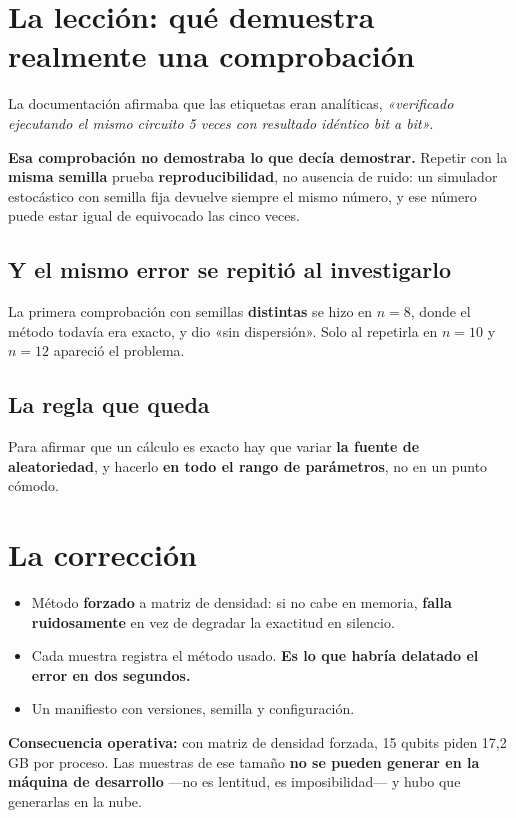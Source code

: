 \section{La lección: qué demuestra realmente una comprobación}
\label{sec:leccion}
La documentación afirmaba que las etiquetas eran analíticas, \textit{«verificado ejecutando el
mismo circuito 5 veces con resultado idéntico bit a bit»}.

\textbf{Esa comprobación no demostraba lo que decía demostrar.} Repetir con la \textbf{misma
semilla} prueba \textbf{reproducibilidad}, no ausencia de ruido: un simulador estocástico con
semilla fija devuelve siempre el mismo número, y ese número puede estar igual de equivocado
las cinco veces.

\subsection{Y el mismo error se repitió al investigarlo}
La primera comprobación con semillas \textbf{distintas} se hizo en $n = 8$, donde el método
todavía era exacto, y dio «sin dispersión». Solo al repetirla en $n = 10$ y $n = 12$ apareció
el problema.

\subsection{La regla que queda}
Para afirmar que un cálculo es exacto hay que variar \textbf{la fuente de aleatoriedad}, y
hacerlo \textbf{en todo el rango de parámetros}, no en un punto cómodo.

\section{La corrección}
\label{sec:correccion}
\begin{itemize}
    \item Método \textbf{forzado} a matriz de densidad: si no cabe en memoria,
          \textbf{falla ruidosamente} en vez de degradar la exactitud en silencio.
    \item Cada muestra registra el método usado. \textbf{Es lo que habría delatado el error en
          dos segundos.}
    \item Un manifiesto con versiones, semilla y configuración.
\end{itemize}

\textbf{Consecuencia operativa:} con matriz de densidad forzada, 15 qubits piden 17,2\,GB por
proceso. Las muestras de ese tamaño \textbf{no se pueden generar en la máquina de desarrollo}
—no es lentitud, es imposibilidad— y hubo que generarlas en la nube.

